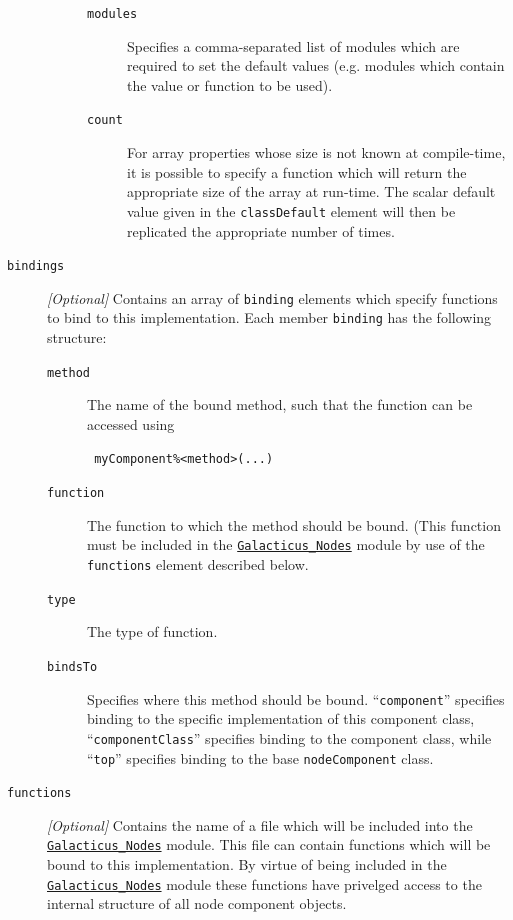 \begin{description}
\begin{description}
\begin{description}
 \item [{\tt modules}] Specifies a comma-separated list of modules which are required to set the default values (e.g. modules which contain the value or function to be used).
 \item [{\tt count}] For array properties whose size is not known at compile-time, it is possible to specify a function which will return the appropriate size of the array at run-time. The scalar default value given in the {\tt classDefault} element will then be replicated the appropriate number of times.
\end{description}
\end{description}
\item [{\tt bindings}] \emph{[Optional]} Contains an array of {\tt binding} elements which specify functions to bind to this implementation. Each member {\tt binding} has the following structure:
\begin{description}
\item [{\tt method}] The name of the bound method, such that the function can be accessed using
\begin{verbatim}
 myComponent%<method>(...)
\end{verbatim}
\item [{\tt function}] The function to which the method should be bound. (This function must be included in the \hyperlink{objects.nodes.F90:galacticus_nodes}{\tt Galacticus\_Nodes} module by use of the {\tt functions} element described below.
\item [{\tt type}] The type of function.
\item [{\tt bindsTo}] Specifies where this method should be bound. ``{\tt component}'' specifies binding to the specific implementation of this component class, ``{\tt componentClass}'' specifies binding to the component class, while ``{\tt top}'' specifies binding to the base {\tt nodeComponent} class.
\end{description}
\item [{\tt functions}] \emph{[Optional]} Contains the name of a file which will be included into the \hyperlink{objects.nodes.F90:galacticus_nodes}{\tt Galacticus\_Nodes} module. This file can contain functions which will be bound to this implementation. By virtue of being included in the \hyperlink{objects.nodes.F90:galacticus_nodes}{\tt Galacticus\_Nodes} module these functions have privelged access to the internal structure of all node component objects.
\end{description}

